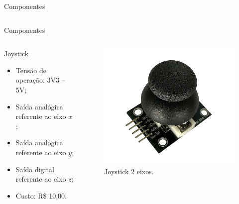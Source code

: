 \documentclass{if-beamer}
\begin{document}
\begin{frame}{Componentes}
\begin{columns}
\begin{column}{0.4\textwidth}
		\end{column}
		
	\end{columns}
	

\end{frame}


\begin{frame}{Componentes}
	
	\begin{columns}
		
		\begin{column}{0.6\textwidth}
			
			\begin{block}{Joystick}
				
				\begin{itemize}
					\item Tensão de operação: 3V3 -- 5V;
					\item Saída analógica referente ao eixo $x$;
					\item Saída analógica referente ao eixo $y$;
					\item Saída digital referente ao eixo $z$;
					\item Custo: R\$ 10,00.
				\end{itemize}
				
			\end{block}
			
		\end{column}
		
		\begin{column}{0.4\textwidth}
			
			\begin{figure}[H]
				\centering
				\includegraphics[width=0.9\linewidth]{img/joystick}
				\caption{Joystick 2 eixos.}
				\label{fig:joystick}
			\end{figure}
			
		\end{column}
		
	\end{columns}
	
	
\end{frame}
\end{document}
